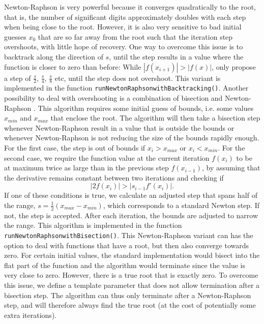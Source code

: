\documentclass[a4paper,11pt]{article}
\newcommand{\pubfunc}[1]{\texttt{#1()}}
\begin{document}
Newton-Raphson is very powerful because it converges quadratically to the root, that is, the number of significant digits approximately doubles with each step when being close to the root. However, it is also very sensitive to bad initial guesses $x_0$ that are so far away from the root such that the iteration step overshoots, with little hope of recovery. One way to overcome this issue is to backtrack along the direction of $s$, until the step results in a value where the function is closer to zero than before: While $|f(x_{i+1})| > |f(x)|$, only propose a step of $\frac{s}{2}$, $\frac{s}{4}$, $\frac{s}{8}$ etc, until the step does not overshoot. This variant is implemented in the function \pubfunc{runNewtonRaphson{\textunderscore}withBacktracking}. Another possibility to deal with overshooting is a combination of bisection and Newton-Raphson \citep{Press2007}. This algorithm requires some initial guess of bounds, i.e. some values $x_{min}$ and $x_{max}$ that enclose the root. The algorithm will then take a bisection step whenever Newton-Raphson result in a value that is outside the bounds or whenever Newton-Raphson is not reducing the size of the bounds rapidly enough. For the first case, the step is out of bounds if $x_i > x_{max}$ or $x_i < x_{min}$. For the second case, we require the function value at the current iteration $f(x_i)$ to be at maximum twice as large than in the previous step $f(x_{i-1})$, by assuming that the derivative remains constant between two iterations and checking if
\begin{equation*}
 |2f(x_i)| > |s_{i-1}f'(x_i)|.
\end{equation*}
If one of these conditions is true, we calculate an adjusted step that spans half of the range, $s = \frac{1}{2}(x_{max}-x_{min})$, which corresponds to a standard Newton step. If not, the step is accepted. After each iteration, the bounds are adjusted to narrow the range. This algorithm is implemented in the function \pubfunc{runNewtonRaphson{\textunderscore}withBisection}. This Newton-Raphson variant can has the option to deal with functions that have a root, but then also converge towards zero.
For certain initial values, the standard implementation would bisect into the flat part of the function and the algorithm would terminate since the value is very close to zero. However, there is a true root that is exactly zero. To overcome this issue, we define a template parameter that does not allow termination after a bisection step. The algorithm can thus only terminate after a Newton-Raphson step, and will therefore always find the true root (at the cost of potentially some extra iterations).
\end{document}
